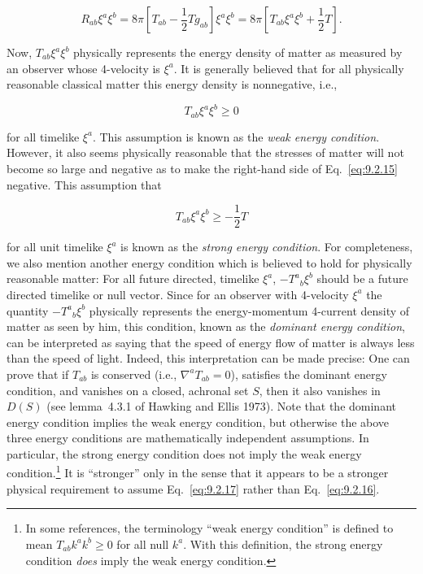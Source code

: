 \begin{equation}
  R_{ab}\xi^a\xi^b
  =8\pi\left[T_{ab}-\frac12Tg_{ab}\right]\xi^a\xi^b
  =8\pi\left[T_{ab}\xi^a\xi^b+\frac12T\right] .
  \tag{9.2.15}\label{eq:9.2.15}
\end{equation}

Now, \(T_{ab}\xi^a\xi^b\) physically represents the energy density of matter as
measured by an observer whose 4-velocity is \(\xi^a\). It is generally believed that
for all physically reasonable classical matter this energy density is nonnegative, i.e.,

\begin{equation}
  T_{ab}\xi^a\xi^b\geq0
  \tag{9.2.16}\label{eq:9.2.16}
\end{equation}

for all timelike \(\xi^a\). This assumption is known as the \emph{weak energy condition}.
However, it also seems physically reasonable that the stresses of matter will not
become so large and negative as to make the right-hand side of Eq.~\eqref{eq:9.2.15}
negative. This assumption that

\begin{equation}
  T_{ab}\xi^a\xi^b\geq-\frac12T
  \tag{9.2.17}\label{eq:9.2.17}
\end{equation}

for all unit timelike \(\xi^a\) is known as the \emph{strong energy condition}. For
completeness, we also mention another energy condition which is believed to hold
for physically reasonable matter: For all future directed, timelike \(\xi^a\),
\(-T^a{}_b\xi^b\) should be a future directed timelike or null vector. Since for an
observer with 4-velocity \(\xi^a\) the quantity \(-T^a{}_b\xi^b\) physically represents
the energy-momentum 4-current density of matter as seen by him, this condition,
known as the \emph{dominant energy condition}, can be interpreted as saying that the
speed of energy flow of matter is always less than the speed of light. Indeed, this
interpretation can be made precise: One can prove that if \(T_{ab}\) is conserved
(i.e., \(\nabla^aT_{ab}=0\)), satisfies the dominant energy condition, and vanishes
on a closed, achronal set \(S\), then it also vanishes in \(D(S)\) (see lemma~4.3.1 of
Hawking and Ellis 1973). Note that the dominant energy condition implies the weak
energy condition, but otherwise the above three energy conditions are mathematically
independent assumptions. In particular, the strong energy condition does not imply
the weak energy condition.\footnote{In some references, the terminology ``weak energy condition'' is defined to mean
\(T_{ab}k^ak^b\geq0\) for all null \(k^a\). With this definition, the strong energy condition \emph{does}
imply the weak energy condition.}
It is ``stronger'' only in the sense that it appears to be a stronger physical
requirement to assume Eq.~\eqref{eq:9.2.17} rather than Eq.~\eqref{eq:9.2.16}.

